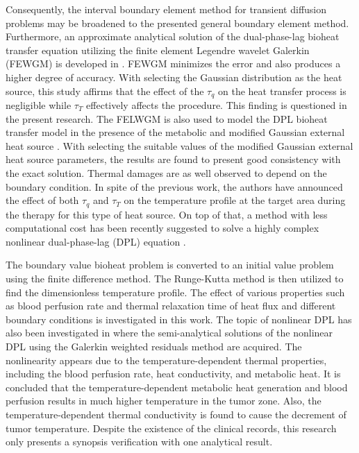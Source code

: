 \documentclass[sn-mathphys]{sn-jnl}%
\theoremstyle{thmstyleone}%
\theoremstyle{thmstyletwo}%
\theoremstyle{thmstylethree}%
\begin{document}
{Consequently, the interval boundary element method for transient diffusion problems may be broadened to the presented general boundary element method. Furthermore, an approximate analytical solution of the dual-phase-lag bioheat transfer equation utilizing the finite element Legendre wavelet Galerkin (FEWGM) is developed in \cite{Kumar20151}. FEWGM minimizes the error and also produces a higher degree of accuracy. With selecting the Gaussian distribution as the heat source, this study affirms that the effect of the $\tau_q$ on the heat transfer process is negligible while $\tau_T$ effectively affects the procedure. This finding is questioned in the present research. The FELWGM is also used to model the DPL bioheat transfer model in the presence of the metabolic and modified Gaussian external heat source \cite{Kumar2016ll}. With selecting the suitable values of the modified Gaussian external heat source parameters, the results are found to present good consistency with the exact solution. Thermal damages are as well observed to depend on the boundary condition. In spite of the previous work, the authors have announced the effect of both $\tau_q$ and $\tau_T$ on the temperature profile at the target area during the therapy for this type of heat source. On top of that, a method with less computational cost has been recently suggested to solve a highly complex nonlinear dual-phase-lag (DPL) equation \cite{TKumari2020}.

The boundary value bioheat problem is converted to an initial value problem using the finite difference method. The Runge-Kutta method is then utilized to find the dimensionless temperature profile. The effect of various properties such as blood perfusion rate and thermal relaxation time of heat flux and different boundary conditions is investigated in this work. The topic of nonlinear DPL has also been investigated in \cite{Arefmanesh2020} where the semi-analytical solutions of the nonlinear DPL using the Galerkin weighted residuals method are acquired. The nonlinearity appears due to the temperature-dependent thermal properties, including the blood perfusion rate, heat conductivity, and metabolic heat. It is concluded that the temperature-dependent metabolic heat generation and blood perfusion results in much higher temperature in the tumor zone. Also, the temperature-dependent thermal conductivity is found to cause the decrement of tumor temperature. Despite the existence of the clinical records, this research only presents a synopsis verification with one analytical result.

}
\end{document}

